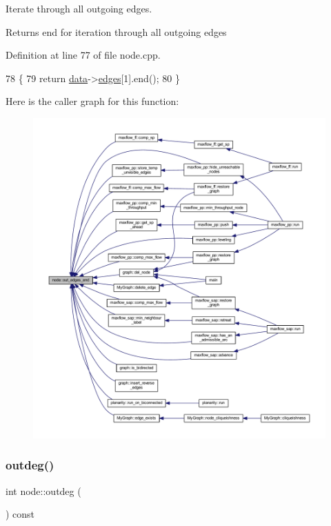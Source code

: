 Iterate through all outgoing edges.

\begin{DoxyReturn}{Returns}
end for iteration through all outgoing edges 
\end{DoxyReturn}


Definition at line 77 of file node.\+cpp.


\begin{DoxyCode}
78 \{
79     \textcolor{keywordflow}{return} \mbox{\hyperlink{classnode_a4ae3d54ebb61be3a102bedf5b91bef75}{data}}->\mbox{\hyperlink{classnode__data_a91690d6d2594423c2cdf8ea083c8bd75}{edges}}[1].end();
80 \}
\end{DoxyCode}
Here is the caller graph for this function\+:\nopagebreak
\begin{figure}[H]
\begin{center}
\leavevmode
\includegraphics[width=350pt]{classnode_a7ce2ba5195a63d4df6b44299a02a9378_icgraph}
\end{center}
\end{figure}
\mbox{\label{classnode_a32adc45c4132e2642ccd2233d79ffe67}} 
\subsubsection{\texorpdfstring{outdeg()}{outdeg()}}
{\footnotesize\ttfamily int node\+::outdeg (\begin{DoxyParamCaption}{ }\end{DoxyParamCaption}) const}

